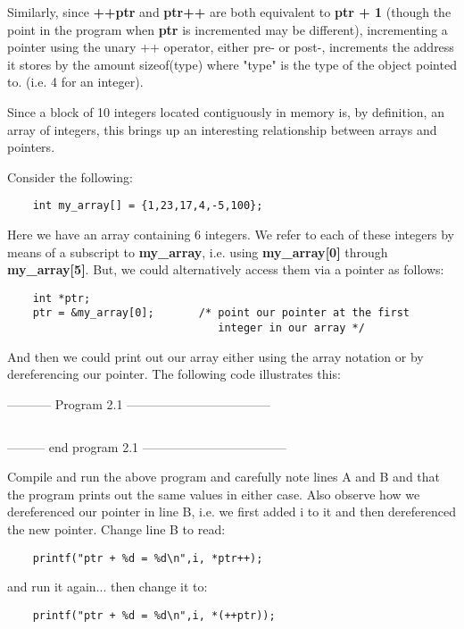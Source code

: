 Similarly, since \textbf{++ptr} and \textbf{ptr++} are both equivalent
to \textbf{ptr + 1} (though the point in the program when \textbf{ptr}
is incremented may be different), incrementing a pointer using the unary
++ operator, either pre- or post-, increments the address it stores by
the amount sizeof(type) where "type" is the type of the object pointed
to. (i.e. 4 for an integer).

Since a block of 10 integers located contiguously in memory is, by
definition, an array of integers, this brings up an interesting
relationship between arrays and pointers.

Consider the following:

\begin{verbatim}
    int my_array[] = {1,23,17,4,-5,100}; 
\end{verbatim}

Here we have an array containing 6 integers. We refer to each of these
integers by means of a subscript to \textbf{my\_array}, i.e. using
\textbf{my\_array{[}0{]}} through \textbf{my\_array{[}5{]}}. But, we
could alternatively access them via a pointer as follows:

\begin{verbatim}
    int *ptr;
    ptr = &my_array[0];       /* point our pointer at the first
                                 integer in our array */ 
\end{verbatim}

And then we could print out our array either using the array notation or
by dereferencing our pointer. The following code illustrates this:

-----------  Program 2.1  -----------------------------------
\inputminted{c}{../src/ch2-1.c}
--------- end program 2.1 -----------------------------------

Compile and run the above program and carefully note lines A and B and
that the program prints out the same values in either case. Also observe
how we dereferenced our pointer in line B, i.e. we first added i to it
and then dereferenced the new pointer. Change line B to read:

\begin{verbatim}
    printf("ptr + %d = %d\n",i, *ptr++);
\end{verbatim}

and run it again... then change it to:

\begin{verbatim}
    printf("ptr + %d = %d\n",i, *(++ptr));
\end{verbatim}

